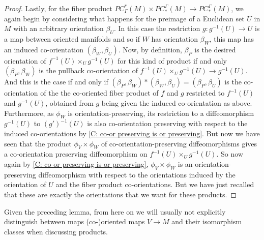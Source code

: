 \begin{proof}
	Lastly, for the fiber product $PC^*_\Gamma(M) \times PC_*^\Gamma(M) \to PC_*^\Gamma(M)$, we again begin by considering what happens for the preimage of a Euclidean set $U$ in $M$ with an arbitrary orientation $\beta_U$.
	In this case the restriction $g \colon g^{-1}(U) \to U$ is a map between oriented manifolds and so if $W$ has orientation $\beta_W$, this map has an induced co-orientation $(\beta_W, \beta_U)$.
	Now, by definition, $\beta_P$ is the desired orientation of $f^{-1}(U) \times_U g^{-1}(U)$ for this kind of product if and only $(\beta_P,\beta_W)$ is the pullback co-orientation of $f^{-1}(U) \times_U g^{-1}(U) \to g^{-1}(U)$. And this is the case if and only if $(\beta_P,\beta_W)*(\beta_W,\beta_U) = (\beta_P, \beta_U)$ is the co-orientation of the the co-oriented fiber product of $f$ and $g$ restricted to $f^{-1}(U)$ and $g^{-1}(U)$, obtained from $g$ being given the induced co-orientation as above.
	Furthermore, as $\phi_W$ is orientation-preserving, its restriction to a diffeomorphism $g^{-1}(U)$ to $(g')^{-1}(U)$ is also co-orientation preserving with respect to the induced co-orientations by \cref{C: co-or preserving is or preserving}.
	But now we have seen that the product $\phi_V \times \phi_W$ of co-orientation-preserving diffeomorphisms gives a co-orientation preserving diffeomorphism on $f^{-1}(U) \times_U g^{-1}(U)$.
	So now again by \cref{C: co-or preserving is or preserving}, $\phi_V \times \phi_W$ is an orientation-preserving diffeomorphism with respect to the orientations induced by the orientation of $U$ and the fiber product  co-orientations.
	But we have just recalled that these are exactly the orientations that we want for these products.
\end{proof}

\begin{comment}
\begin{remark}\label{R: product preserves reverse}
	It is easy to modify the preceding arguments to show that if exactly one of $\phi_V \colon V \to V'$ or $\phi_W \colon W \to W'$ is an orientation- or co-orientation-\textit{reversing} diffeomorphism, then $\phi_V \times \phi_W$ restricts to a corresponding orientation- or co-orientation-\textit{reversing} diffeomorphism $V \times_M W \to V' \times_M W'$.
\end{remark}
\end{comment}

Given the preceding lemma, from here on we will usually not explicitly distinguish between maps (co\nobreakdash-)oriented maps $V \to M$ and their isomorphism classes when discussing products.






